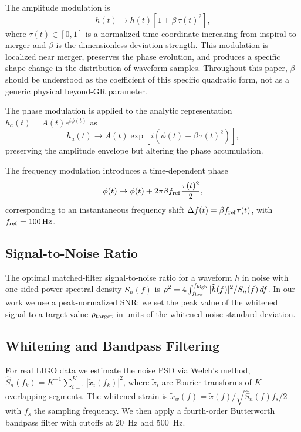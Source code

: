 The amplitude modulation is
\begin{equation}
    h(t) \rightarrow h(t) \left[ 1 + \beta\, \tau(t)^2 \right],
    \label{eq:amp_dev}
\end{equation}
where $\tau(t) \in [0, 1]$ is a normalized time coordinate increasing
from inspiral to merger and $\beta$ is the dimensionless deviation
strength. This modulation is localized near merger, preserves the
phase evolution, and produces a specific shape change in the
distribution of waveform samples. Throughout this paper, $\beta$
should be understood as the coefficient of this specific quadratic
form, not as a generic physical beyond-GR parameter.

The phase modulation is applied to the analytic representation
$h_a(t) = A(t) e^{i\phi(t)}$ as
\begin{equation}
    h_a(t) \rightarrow A(t) \exp\left[ i \left( \phi(t) + \beta\, \tau(t)^2 \right) \right],
    \label{eq:phase_dev}
\end{equation}
preserving the amplitude envelope but altering the phase
accumulation.

The frequency modulation introduces a time-dependent phase
\begin{equation}
    \phi(t) \rightarrow \phi(t) + 2\pi \beta f_{\rm ref} \frac{\tau(t)^2}{2},
    \label{eq:freq_dev}
\end{equation}
corresponding to an instantaneous frequency shift
$\Delta f(t) = \beta f_{\rm ref} \tau(t)$, with $f_{\rm ref} = \SI{100}{Hz}$.

\subsection{Signal-to-Noise Ratio}

The optimal matched-filter signal-to-noise ratio for a waveform $h$
in noise with one-sided power spectral density $S_n(f)$ is
$\rho^2 = 4 \int_{f_{\rm low}}^{f_{\rm high}} |\tilde{h}(f)|^2 / S_n(f) \, df$.
In our work we use a peak-normalized SNR: we set the peak value of
the whitened signal to a target value $\rho_{\rm target}$ in units
of the whitened noise standard deviation.

\subsection{Whitening and Bandpass Filtering}

For real LIGO data we estimate the noise PSD via Welch's method,
$\hat{S}_n(f_k) = K^{-1} \sum_{i=1}^{K} |\tilde{x}_i(f_k)|^2$, where
$\tilde{x}_i$ are Fourier transforms of $K$ overlapping segments. The
whitened strain is
$\tilde{x}_w(f) = \tilde{x}(f) / \sqrt{\hat{S}_n(f) f_s / 2}$ with
$f_s$ the sampling frequency. We then apply a fourth-order Butterworth
bandpass filter with cutoffs at \SI{20}{Hz} and \SI{500}{Hz}.

